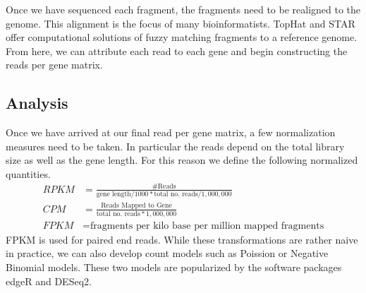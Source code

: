 \documentclass[11pt]{article}
\begin{document}
Once we have sequenced each fragment, the fragments need to be realigned to the genome. This alignment is the focus of many bioinformatists. TopHat and STAR offer computational solutions of fuzzy matching fragments to a reference genome. From here, we can attribute each read to each gene and begin constructing the reads per gene matrix. 

\subsection{Analysis}
Once we have arrived at our final read per gene matrix, a few normalization measures need to be taken. In particular the reads depend on the total library size as well as the gene length. For this reason we define the following normalized quantities. 
\begin{align*}
RPKM &= \frac{\#\text{Reads}}{\text{gene length}/1000 * \text{total no. reads}/1,000,000}\\
CPM &= \frac{\text{Reads Mapped to Gene}}{\text{total no. reads}*1,000,000}\\
FPKM &= \text{fragments per kilo base per million mapped fragments}
\end{align*}
FPKM is used for paired end reads. While these transformations are rather naive in practice, we can also develop count models such as Poission or Negative Binomial models. These two models are popularized by the software packages edgeR and DESeq2. 
\end{document}
